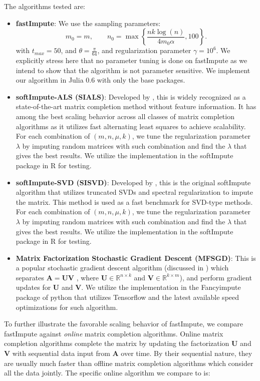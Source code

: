 \documentclass[twoside,11pt]{article}
\newcommand{\md}[1]{\mathbb{#1}}
\begin{document}
 The algorithms tested are:
 \begin{itemize}
     \item \textbf{fastImpute}: We use the sampling parameters:
     $$m_0=m, \qquad n_0=\max\left\{\frac{nk\log (n)}{4m_0\alpha},100\right\}.$$
     with $t_{max}=50$, and $\theta=\frac{\pi}{64}$, and regularization parameter $\gamma=10^6$. We explicitly stress here that no parameter tuning is done on fastImpute as we intend to show that the algorithm is not parameter sensitive. We implement our algorithm in Julia 0.6 with only the base packages.
     \item \textbf{softImpute-ALS (SIALS)}: Developed by \cite{softimputeals}, this is widely recognized as a state-of-the-art matrix completion method without feature information. It has among the best scaling behavior across all classes of matrix completion algorithms as it utilizes fast alternating least squares to achieve  scalability. For each combination of $(m,n,\mu,k)$, we tune the regularization parameter $\lambda$ by imputing random matrices with such combination and find the $\lambda$ that gives the best results. We utilize the implementation in the softImpute package in R for testing.
     \item \textbf{softImpute-SVD (SISVD)}: Developed by \cite{SoftImpute}, this is the original softImpute algorithm that utilizes truncated SVDs and spectral regularization to impute the matrix. This method is used as a fast benchmark for SVD-type methods. For each combination of $(m,n,\mu,k)$, we tune the regularization parameter $\lambda$ by imputing random matrices with such combination and find the $\lambda$ that gives the best results. We utilize the implementation in the softImpute package in R for testing.
     \item \textbf{Matrix Factorization Stochastic Gradient Descent (MFSGD)}: This is a popular stochastic gradient descent algorithm (discussed in \cite{jin2016provable}) which separates $\bm{A}=\bm{U}\bm{V}$ , where $\bm{U} \in \md{R}^{n \times k}$ and $\bm{V}\in \md{R}^{k \times m}$), and perform gradient updates for $\bm{U}$ and $\bm{V}$. We utilize the implementation in the Fancyimpute package of python that utilizes Tensorflow and the latest available speed optimizations for such algorithm. 
 \end{itemize}
To further illustrate the favorable scaling behavior of fastImpute, we 
 compare fastImpute against \emph{online} matrix completion algorithms. Online matrix completion algorithms complete the matrix by updating the factorization $\bm{U}$ and $\bm{V}$ with sequential data input from $\bm{A}$ over time. By their sequential nature, they are usually much faster than offline matrix completion algorithms which consider all the data  jointly.  The specific online algorithm we  compare to is:
\end{document}
